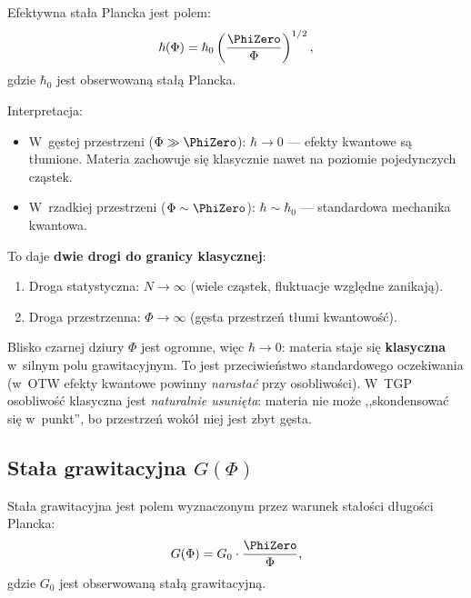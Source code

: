 \begin{axiom}\label{ax:hbar}
Efektywna sta\l{}a Plancka jest polem:
\begin{equation}\label{eq:hbarPhi}
    \hbar(\Phi) = \hbar_0 \left(\frac{\PhiZero}{\Phi}\right)^{1/2},
\end{equation}
gdzie $\hbar_0$ jest obserwowaną sta\l{}\k{a} Plancka.
\end{axiom}

Interpretacja:
\begin{itemize}[nosep]
  \item W~g\k{e}stej przestrzeni ($\Phi \gg \PhiZero$):
        $\hbar \to 0$ --- efekty kwantowe s\k{a} t\l{}umione.
        Materia zachowuje si\k{e} klasycznie nawet na poziomie
        pojedynczych cz\k{a}stek.
  \item W~rzadkiej przestrzeni ($\Phi \sim \PhiZero$):
        $\hbar \sim \hbar_0$ --- standardowa mechanika kwantowa.
\end{itemize}

To daje \textbf{dwie drogi do granicy klasycznej}:
\begin{enumerate}[nosep]
  \item Droga statystyczna: $N \to \infty$ (wiele cz\k{a}stek,
        fluktuacje wzgl\k{e}dne zanikaj\k{a}).
  \item Droga przestrzenna: $\Phi \to \infty$ (g\k{e}sta
        przestrze\'n t\l{}umi kwantowo\'s\'c).
\end{enumerate}

\begin{remark}
Blisko czarnej dziury $\Phi$ jest ogromne, wi\k{e}c $\hbar \to 0$:
materia staje si\k{e} \textbf{klasyczna} w~silnym polu grawitacyjnym.
To jest przeciwie\'nstwo standardowego oczekiwania (w~OTW
efekty kwantowe powinny \emph{narastać} przy osobliwo\'sci).
W~TGP osobliwo\'s\'c klasyczna jest \emph{naturalnie usuni\k{e}ta}:
materia nie mo\.ze ,,skondensowa\'c si\k{e} w~punkt'', bo przestrze\'n
wok\'o\l{} niej jest zbyt g\k{e}sta.
\end{remark}

\subsection{Sta\l{}a grawitacyjna $G(\Phi)$}\label{ssec:G}

\begin{axiom}\label{ax:G}
Sta\l{}a grawitacyjna jest polem wyznaczonym przez warunek
sta\l{}o\'sci d\l{}ugo\'sci Plancka:
\begin{equation}\label{eq:GPhi}
    G(\Phi) = G_0 \cdot \frac{\PhiZero}{\Phi},
\end{equation}
gdzie $G_0$ jest obserwowaną sta\l{}\k{a} grawitacyjn\k{a}.
\end{axiom}

